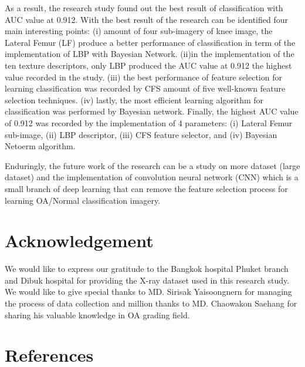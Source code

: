 \documentclass[review]{elsarticle}
\begin{document}
As a result, the research study found out the best result of classification with AUC value at 0.912. With the best result of the research can be identified four main interesting points: (i) amount of four sub-imagery of knee image, the Lateral Femur (LF) produce a better performance of classification in term of the implementation of LBP with Bayesian Network. (ii)in the implementation of the ten texture descriptors, only LBP produced the AUC value at 0.912 the highest value recorded in the study. (iii) the best performance of feature selection for learning classification was recorded by CFS amount of five well-known feature selection techniques. (iv) lastly, the most efficient learning algorithm for classification was performed by Bayesian network. Finally, the highest AUC value of 0.912 was recorded by the implementation of 4 parameters: (i) Lateral Femur sub-image, (ii) LBP descriptor, (iii) CFS feature selector, and (iv) Bayesian Netoerm algorithm. 

Enduringly, the future work of the research can be a study on more dataset (large dataset) and the implementation of convolution neural network (CNN) which is a small branch of deep learning that can remove the feature selection process for learning OA/Normal classification imagery. 

\section{Acknowledgement}

We would like to express our gratitude to the Bangkok hospital Phuket branch and Dibuk hospital for providing the X-ray dataset used in this research study. We would like to give special thanks to MD. Sirisak Yaisoongnern for managing the process of data collection and million thanks to MD. Chaowakon Saehang for sharing his valuable knowledge in OA grading field.

\section*{References}


\end{document}
